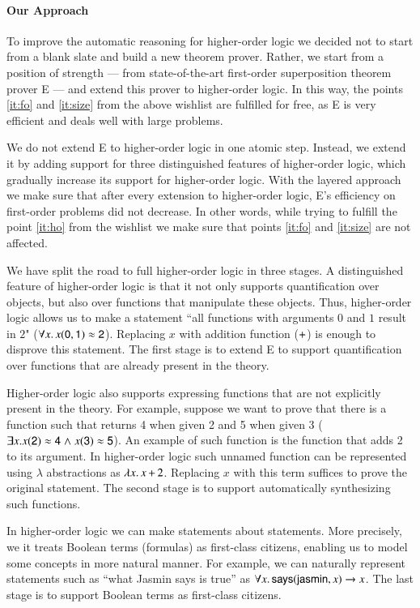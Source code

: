 \paragraph{Our Approach} To improve the automatic reasoning for higher-order
logic we decided not to start from a blank slate and build a new theorem prover.
Rather, we start from a position of strength --- from state-of-the-art
first-order superposition theorem prover E \cite{scv-19-e23} --- and extend this
prover to higher-order logic. In this way, the points \ref{it:fo} and
\ref{it:size} from the above wishlist are fulfilled for free, as E is very
efficient and deals well with large problems.

We do not extend E to higher-order logic in one atomic step. Instead, we extend
it by adding support for three distinguished features of higher-order logic,
which gradually increase its support for higher-order logic. With the layered
approach we make sure that after every extension to higher-order logic, E's
efficiency on first-order problems did not decrease. In other words, while trying
to fulfill the point \ref{it:ho} from the wishlist we make sure that points
\ref{it:fo} and \ref{it:size} are not affected.

We have split the road to full higher-order logic in three stages. A
distinguished feature of higher-order logic is that it not only supports
quantification over objects, but also over functions that manipulate these
objects. Thus, higher-order logic allows us to make a statement ``all functions
with arguments $0$ and $1$ result in $2$" ($\forall x. \,  x (\mathsf{0}, \mathsf{1}) \approx
\mathsf{2}$). Replacing $x$ with addition function ($\mathsf{+}$) is enough to
disprove this statement. The first stage is to extend E to support
quantification over functions that are already present in the theory.

Higher-order logic also supports expressing functions that are not explicitly
present in the theory. For example, suppose we want to prove that there is a
function such that returns 4 when given 2 and 5 when given 3 ($\exists x.
x(\mathsf{2}) \approx \mathsf{4} \mathrel\land x (\mathsf{3}) \approx \mathsf{5} $). An example of such
function is the function that adds 2 to its argument. In higher-order logic such
unnamed function can be represented using $\lambda$ abstractions as $\lambda
x.\, x \, \mathsf{+} \, 2$. Replacing $x$ with this term suffices to prove the
original statement. The second stage is to support automatically synthesizing
such functions.

In higher-order logic we can make statements about statements. More precisely,
we it treats Boolean terms (formulas) as first-class citizens, enabling us to
model some concepts in more natural manner. For example, we can naturally
represent statements such as ``what Jasmin says is true'' as $\forall x. \,
\mathsf{says}(\mathsf{jasmin}, x) \rightarrow x$. The last stage is to support Boolean terms
as first-class citizens.

